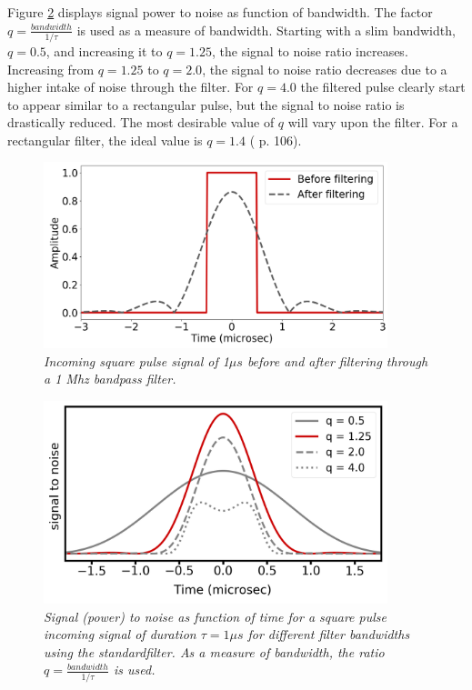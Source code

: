 \documentclass[letterpaper]{book}
\begin{document}
Figure \ref{fig:variable_bandwidth} displays signal power to noise as function of bandwidth. The factor \(q=\frac{bandwidth}{1/\tau}\) is used as a measure of bandwidth. Starting with a slim bandwidth, \(q=0.5\), and increasing it to \(q=1.25\), the signal to noise ratio increases. Increasing from \(q=1.25\) to \(q=2.0\), the signal to noise ratio decreases due to a higher intake of noise through the filter. For \(q=4.0\) the filtered pulse clearly start to appear similar to a rectangular pulse, but the signal to noise ratio is drastically reduced. The most desirable value of \(q\) will vary upon the filter. For a rectangular filter, the ideal value is \(q=1.4\) (\cite{ref:levanon} p. 106). 
\begin{figure}
  \includegraphics[width=10cm]{PulseFiltering.png}
  \caption{\textit{Incoming square pulse signal of 1\(\mu s\) before and after filtering through a 1 Mhz bandpass filter.}}
  \label{fig:filtered_pulse}
\end{figure}
\begin{figure}
  \includegraphics[width=10cm]{VariableBandwith.png}
  \caption{\textit{Signal (power) to noise as function of time for a square pulse incoming signal of duration \(\tau=1\mu s\) for different filter bandwidths using the standardfilter. As a measure of bandwidth, the ratio \(q = \frac{bandwidth}{1/\tau}\) is used.}}
  \label{fig:variable_bandwidth}
\end{figure}
\end{document}
